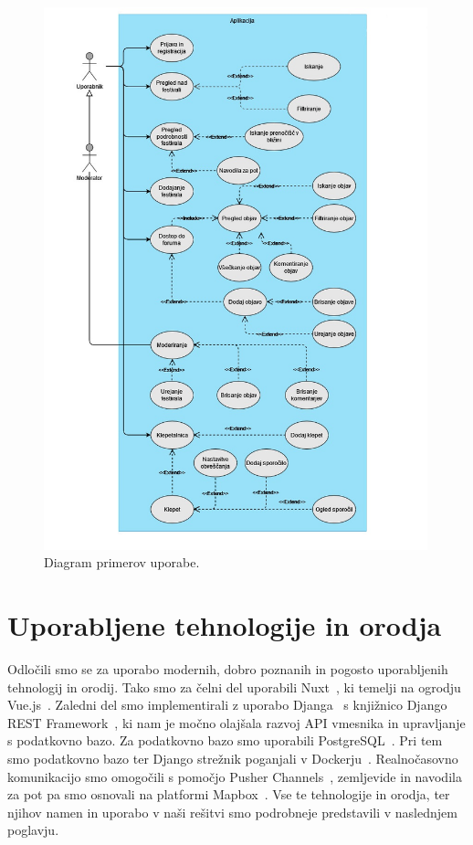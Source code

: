 \documentclass[a4paper,12pt,openright]{book}
\begin{document}
\begin{figure}[p] %
\begin{center}
    \includegraphics[width=0.99\textwidth]{img/UseCase}
\end{center}
\caption{Diagram primerov uporabe.}
\label{usecase}
\end{figure}

\chapter{Uporabljene tehnologije in orodja}
Odločili smo se za uporabo modernih, dobro poznanih in pogosto uporabljenih tehnologij in orodij.
Tako smo za čelni del uporabili Nuxt~\cite{nuxtintro}, ki temelji na ogrodju Vue.js~\cite{vuejs}.
Zaledni del smo implementirali z uporabo Djanga~\cite{django} s knjižnico Django REST Framework~\cite{drf}, ki nam je močno olajšala razvoj API vmesnika in upravljanje s podatkovno bazo.
Za podatkovno bazo smo uporabili PostgreSQL~\cite{postgre}.
Pri tem smo podatkovno bazo ter Django strežnik poganjali v Dockerju~\cite{docker}.
Realnočasovno komunikacijo smo omogočili s pomočjo Pusher Channels~\cite{pusher}, zemljevide in navodila za pot pa smo osnovali na platformi Mapbox~\cite{mapbox}.
Vse te tehnologije in orodja, ter njihov namen in uporabo v naši rešitvi smo podrobneje predstavili v naslednjem poglavju.
\end{document}
